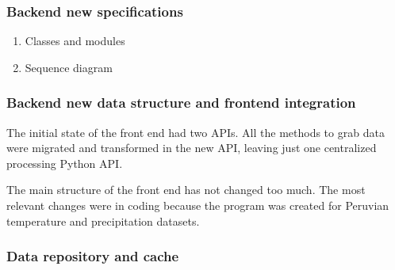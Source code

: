 \documentclass[a4paper]{article}
\begin{document}
\large
\begin{center}

\end{center}
\normalsize

\subsubsection{Backend new specifications}
\label{sec:org0d2a09e}

\begin{enumerate}
\item Classes and modules
\label{sec:org5431e80}

\begin{center}

\end{center}

\item Sequence diagram
\label{sec:org2c9fcd2}

\small
\begin{center}

\end{center}
\normalsize
\end{enumerate}

\subsubsection{Backend new data structure and frontend integration}
\label{sec:org6d2231c}

The initial state of the front end had two APIs. All the methods to grab data were migrated and transformed in the new API, leaving just one centralized processing Python API.

The main structure of the front end has not changed too much. The most relevant changes were in coding because the program was created for Peruvian temperature and precipitation datasets.

\begin{center}

\end{center}

\subsubsection{Data repository and cache}
\label{sec:org96ad333}
\end{document}
